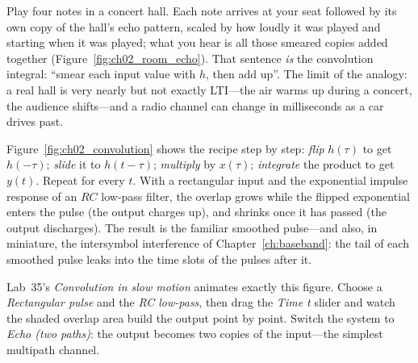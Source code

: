 
\begin{analogy}
Play four notes in a concert hall. Each note arrives at your seat followed by its own copy of the
hall's echo pattern, scaled by how loudly it was played and starting when it was played; what you
hear is all those smeared copies added together (Figure~\ref{fig:ch02_room_echo}). That sentence
\emph{is} the convolution integral: ``smear each input value with $h$, then add up''. The limit of
the analogy: a real hall is very nearly but not exactly LTI---the air warms up during a concert, the
audience shifts---and a radio channel can change in milliseconds as a car drives past.
\end{analogy}

Figure~\ref{fig:ch02_convolution} shows the recipe step by step: \emph{flip} $h(\tau)$ to get
$h(-\tau)$; \emph{slide} it to $h(t-\tau)$; \emph{multiply} by $x(\tau)$; \emph{integrate} the
product to get $y(t)$. Repeat for every $t$. With a rectangular input and the exponential impulse
response of an $RC$ low-pass filter, the overlap grows while the flipped exponential enters the pulse
(the output charges up), and shrinks once it has passed (the output discharges). The result is the
familiar smoothed pulse---and also, in miniature, the intersymbol interference of
Chapter~\ref{ch:baseband}: the tail of each smoothed pulse leaks into the time slots of the pulses
after it.


\begin{tryit}
Lab~35's \emph{Convolution in slow motion} animates exactly this figure. Choose a
\emph{Rectangular pulse} and the \emph{RC low-pass}, then drag the \emph{Time t} slider and watch the
shaded overlap area build the output point by point. Switch the system to \emph{Echo (two paths)}:
the output becomes two copies of the input---the simplest multipath channel.
\end{tryit}

